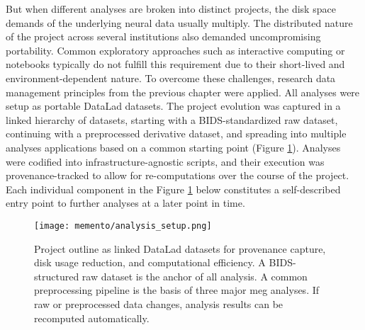 But when different analyses are broken into distinct projects, the disk space demands of the underlying neural data usually multiply.
The distributed nature of the project across several institutions also demanded uncompromising portability.
Common exploratory approaches such as interactive computing or notebooks typically do not fulfill this requirement due to their short-lived and environment-dependent nature.
To overcome these challenges, research data management principles from the previous chapter were applied.
All analyses were setup as portable DataLad datasets.
The project evolution was captured in a linked hierarchy of datasets, starting with a BIDS-standardized raw dataset, continuing with a preprocessed derivative dataset, and spreading into multiple analyses applications based on a common starting point (Figure \ref{fig:outline_memento}).
Analyses were codified into infrastructure-agnostic scripts, and their execution was provenance-tracked to allow for re-computations over the course of the project.
Each individual component in the Figure \ref{fig:outline_memento} below constitutes a self-described entry point to further analyses at a later point in time.

\begin{figure}[H]
	\centering
	\texttt{[image: memento/analysis\_setup.png]}
	\caption[Memento analysis outline]{Project outline as linked DataLad datasets for provenance capture, disk usage reduction, and computational efficiency. A \gls{BIDS}-structured raw dataset is the anchor of all analysis. A common preprocessing pipeline is the basis of three major \gls{meg} analyses. If raw or preprocessed data changes, analysis results can be recomputed automatically.}
	\label{fig:outline_memento}
\end{figure}
%








